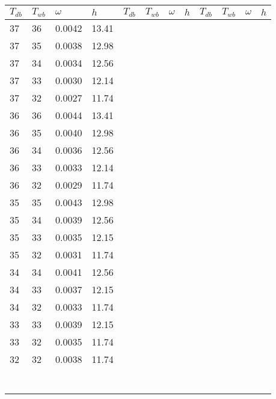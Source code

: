 \begin{tabular}{llll|llll|llll}
 \toprule 
\(T_{db}\) & \(T_{wb}\) & \(\omega\) & \(h\) & \(T_{db}\) & \(T_{wb}\) & \(\omega\) & \(h\) & \(T_{db}\) & \(T_{wb}\) & \(\omega\) & \(h\)  \\ \midrule 
37 & 36 & 0.0042 & 13.41 &  &  &  &  &  &  &  & \\
37 & 35 & 0.0038 & 12.98 &  &  &  &  &  &  &  & \\
37 & 34 & 0.0034 & 12.56 &  &  &  &  &  &  &  & \\
37 & 33 & 0.0030 & 12.14 &  &  &  &  &  &  &  & \\
37 & 32 & 0.0027 & 11.74 &  &  &  &  &  &  &  & \\
36 & 36 & 0.0044 & 13.41 &  &  &  &  &  &  &  & \\
36 & 35 & 0.0040 & 12.98 &  &  &  &  &  &  &  & \\
36 & 34 & 0.0036 & 12.56 &  &  &  &  &  &  &  & \\
36 & 33 & 0.0033 & 12.14 &  &  &  &  &  &  &  & \\
36 & 32 & 0.0029 & 11.74 &  &  &  &  &  &  &  & \\
35 & 35 & 0.0043 & 12.98 &  &  &  &  &  &  &  & \\
35 & 34 & 0.0039 & 12.56 &  &  &  &  &  &  &  & \\
35 & 33 & 0.0035 & 12.15 &  &  &  &  &  &  &  & \\
35 & 32 & 0.0031 & 11.74 &  &  &  &  &  &  &  & \\
34 & 34 & 0.0041 & 12.56 &  &  &  &  &  &  &  & \\
34 & 33 & 0.0037 & 12.15 &  &  &  &  &  &  &  & \\
34 & 32 & 0.0033 & 11.74 &  &  &  &  &  &  &  & \\
33 & 33 & 0.0039 & 12.15 &  &  &  &  &  &  &  & \\
33 & 32 & 0.0035 & 11.74 &  &  &  &  &  &  &  & \\
32 & 32 & 0.0038 & 11.74 &  &  &  &  &  &  &  & \\
 &  &  &  &  &  &  &  &  &  &  & \\
 &  &  &  &  &  &  &  &  &  &  & \\
 &  &  &  &  &  &  &  &  &  &  & \\
 &  &  &  &  &  &  &  &  &  &  & \\
 &  &  &  &  &  &  &  &  &  &  & \\
 &  &  &  &  &  &  &  &  &  &  & \\
 &  &  &  &  &  &  &  &  &  &  & \\

\end{tabular}
